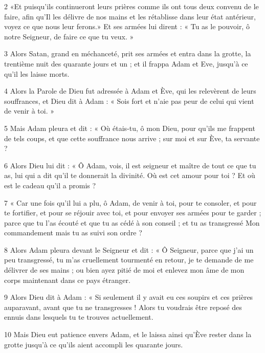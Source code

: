 \par 2 «Et puisqu'ils continueront leurs prières comme ils ont tous deux convenu de le faire, afin qu'Il les délivre de nos mains et les rétablisse dans leur état antérieur, voyez ce que nous leur ferons.» Et ses armées lui dirent : « Tu as le pouvoir, ô notre Seigneur, de faire ce que tu veux. »

\par 3 Alors Satan, grand en méchanceté, prit ses armées et entra dans la grotte, la trentième nuit des quarante jours et un ; et il frappa Adam et Eve, jusqu'à ce qu'il les laisse morts.

\par 4 Alors la Parole de Dieu fut adressée à Adam et Ève, qui les relevèrent de leurs souffrances, et Dieu dit à Adam : « Sois fort et n'aie pas peur de celui qui vient de venir à toi. »

\par 5 Mais Adam pleura et dit : « Où étais-tu, ô mon Dieu, pour qu'ils me frappent de tels coups, et que cette souffrance nous arrive ; sur moi et sur Ève, ta servante ?

\par 6 Alors Dieu lui dit : « Ô Adam, vois, il est seigneur et maître de tout ce que tu as, lui qui a dit qu'il te donnerait la divinité. Où est cet amour pour toi ? Et où est le cadeau qu’il a promis ?

\par 7 « Car une fois qu'il lui a plu, ô Adam, de venir à toi, pour te consoler, et pour te fortifier, et pour se réjouir avec toi, et pour envoyer ses armées pour te garder ; parce que tu l'as écouté et que tu as cédé à son conseil ; et tu as transgressé Mon commandement mais tu as suivi son ordre ?

\par 8 Alors Adam pleura devant le Seigneur et dit : « Ô Seigneur, parce que j'ai un peu transgressé, tu m'as cruellement tourmenté en retour, je te demande de me délivrer de ses mains ; ou bien ayez pitié de moi et enlevez mon âme de mon corps maintenant dans ce pays étranger.

\par 9 Alors Dieu dit à Adam : « Si seulement il y avait eu ces soupirs et ces prières auparavant, avant que tu ne transgresses ! Alors tu voudrais être reposé des ennuis dans lesquels tu te trouves actuellement.

\par 10 Mais Dieu eut patience envers Adam, et le laissa ainsi qu'Ève rester dans la grotte jusqu'à ce qu'ils aient accompli les quarante jours.

